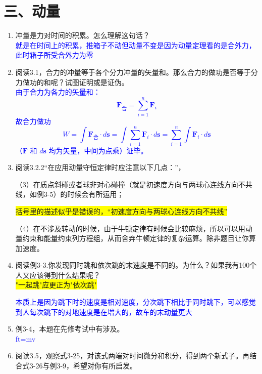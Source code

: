 \documentclass[12pt,a4paper]{article}
\begin{document}
\section{三、动量}
\begin{enumerate}[label=\arabic*.,leftmargin=*]
    \item 冲量是力对时间的积累。怎么理解这句话？\\
    \textcolor{blue}{就是在时间上的积累，推箱子不动但动量不变是因为动量定理看的是合外力，此时箱子所受合外力为零}

    \item 阅读3.1，合力的冲量等于各个分力冲量的矢量和。那么合力的做功是否等于分力做功的和呢？试图证明或是证伪。\\
    \textcolor{blue}{由于合力为各力的矢量和：
\[
\boldsymbol{F}_{\text{合}}=\sum_{i=1}^{n}\boldsymbol{F}_{i}
\]
故合力做功
\[
W=\int \boldsymbol{F}_{\text{合}}\cdot d\boldsymbol{s}
=\int \sum_{i=1}^{n}\boldsymbol{F}_{i}\cdot d\boldsymbol{s}
=\sum_{i=1}^{n}\int \boldsymbol{F}_{i}\cdot d\boldsymbol{s}
\]
（$\boldsymbol{F}$ 和 $d\boldsymbol{s}$ 均为矢量，中间为点乘）证毕。}

    \item 阅读3.2.2“在应用动量守恒定律时应注意以下几点：”，
    
    （3）在质点斜碰或者球非对心碰撞（就是初速度方向与两球心连线方向不共线，如例3-5）的时候会有所运用；
    
    \colorbox{yellow}{括号里的描述似乎是错误的，“初速度方向与两球心连线方向不共线”}

    （4）在不涉及转动的时候，由于牛顿定律有时候会比较麻烦，所以可以用动量约束和能量约束列方程组，从而舍弃牛顿定律的复杂运算。除非题目让你算加速度。

    \item 阅读例3-3.你发现同时跳和依次跳的末速度是不同的。为什么？如果我有100个人又应该得到什么结果呢？\\
    \colorbox{yellow}{"一起跳"应更正为"依次跳"}

    \textcolor{blue}{本质上是因为跳下时的速度是相对速度，分次跳下相比于同时跳下，可以感觉到人每次跳下的对地速度是在增大的，故车的末动量更大}

    \item 例3-4，本题在先修考试中有涉及。\\
    \textcolor{blue}{ft=mv}

    \item 阅读3.5，观察式3-25，对该式两端对时间微分和积分，得到两个新式子。再结合式3-26与例3-9，希望对你有所启发。


\end{enumerate}
\end{document}
